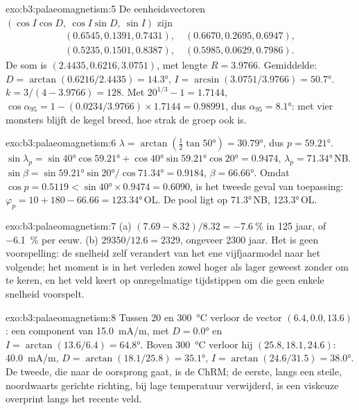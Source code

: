 \begin{solution}{exo:b3:palaeomagnetism:5}
De eenheidsvectoren $(\cos I\cos D,\ \cos I\sin D,\ \sin I)$ zijn
\begin{gather*}
  (0.6545, 0.1391, 0.7431),\quad (0.6670, 0.2695, 0.6947),\\
  (0.5235, 0.1501, 0.8387),\quad (0.5985, 0.0629, 0.7986).
\end{gather*}
De som is $(2.4435, 0.6216, 3.0751)$, met lengte $R = 3.9766$. Gemiddelde:
$D = \arctan(0.6216/2.4435) = \ang{14.3}$, $I = \arcsin(3.0751/3.9766) =
\ang{50.7}$. $k = 3/(4 - 3.9766) = 128$. Met $20^{1/3} - 1 = 1.7144$,
$\cos\alpha_{95} = 1 - (0.0234/3.9766)\times1.7144 = 0.98991$, dus
$\alpha_{95} = \ang{8.1}$: met vier monsters blijft de kegel breed, hoe
strak de groep ook is.
\end{solution}

\begin{solution}{exo:b3:palaeomagnetism:6}
\sloppy $\lambda = \arctan(\tfrac12\tan\ang{50}) = \ang{30.79}$, dus $p = \ang{59.21}$.
$\sin\lambda_p = \sin\ang{40}\cos\ang{59.21} + \cos\ang{40}\sin\ang{59.21}
\cos\ang{20} = 0.9474$, $\lambda_p = \ang{71.34}$\,NB. $\sin\beta =
\sin\ang{59.21}\sin\ang{20}/\cos\ang{71.34} = 0.9184$, $\beta = \ang{66.66}$.
Omdat $\cos p = 0.5119 < \sin\ang{40}\times0.9474 = 0.6090$, is het tweede geval
van toepassing: $\varphi_p = 10 + 180 - 66.66 = \ang{123.34}$\,OL. De pool ligt op
\ang{71.3}\,NB, \ang{123.3}\,OL.\par
\end{solution}

\begin{solution}{exo:b3:palaeomagnetism:7}
(a) $(7.69 - 8.32)/8.32 = \qty{-7.6}{\percent}$ in 125 jaar, of
\qty{-6.1}{\percent} per eeuw. (b) $29350/12.6 = 2329$, ongeveer 2300 jaar.
Het is geen voorspelling: de snelheid zelf verandert van het ene vijfjaarmodel naar het
volgende; het moment is in het verleden zowel hoger als lager geweest zonder
om te keren, en het veld keert op onregelmatige tijdstippen om die
geen enkele snelheid voorspelt.
\end{solution}

\begin{solution}{exo:b3:palaeomagnetism:8}
Tussen 20 en \qty{300}{\celsius} verloor de vector $(6.4, 0.0, 13.6)$: een
component van \qty{15.0}{mA/m}, met $D = \ang{0.0}$ en
$I = \arctan(13.6/6.4) = \ang{64.8}$. Boven \qty{300}{\celsius} verloor hij $(25.8, 18.1, 24.6)$:
\qty{40.0}{mA/m}, $D = \arctan(18.1/25.8) = \ang{35.1}$, $I =
\arctan(24.6/31.5) = \ang{38.0}$. De tweede, die naar de oorsprong gaat, is de
ChRM; de eerste, langs een steile, noordwaarts gerichte richting, bij lage
temperatuur verwijderd, is een viskeuze overprint langs het recente veld.
\end{solution}


